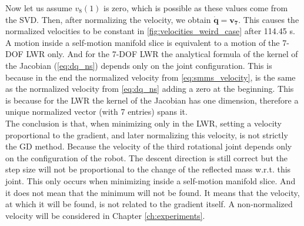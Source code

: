 Now let us assume  $v_8(1)$ is zero, which is possible as these values come from the SVD. Then, after normalizing the velocity, we obtain $\mathbf{\dot{q} =v_7 }$. This causes the normalized velocities to be constant in  \ref{fig:velocities_weird_case} after 114.45 s.\\
%
A motion inside a self-motion manifold slice is equivalent to a motion of the 7-DOF LWR only. And for the 7-DOF LWR the analytical formula of the kernel of the Jacobian (\ref{eq:dq_ns}) depends only on the joint configuration. This is because in the end the normalized velocity from \ref{eq:smms_velocity}, is the same as the normalized velocity from \ref{eq:dq_ns} adding a zero at the beginning. This is because for the LWR the kernel of the Jacobian has one dimension, therefore a unique normalized vector (with 7 entries) spans it. \\
The conclusion is that, when minimizing only in the LWR, setting a velocity proportional to the gradient, and later normalizing this velocity, is not strictly the GD method. Because the velocity of the third rotational joint depends only on the configuration of the robot. The descent direction is still correct but the step size will not be proportional to the change of the reflected mass w.r.t. this joint. 
This only occurs when minimizing inside a self-motion manifold slice.  And it does not mean that the minimum will not be found. It means that the velocity, at which it will be found, is not related to the gradient itself.
A non-normalized velocity will be considered in  Chapter  \ref{ch:experiments}.






